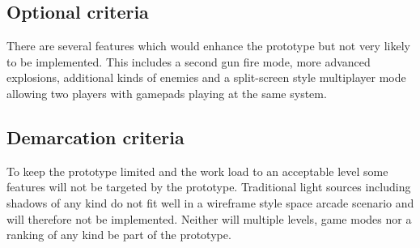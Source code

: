 \documentclass[a4paper]{article}
\begin{document}
\subsection*{Optional criteria}
There are several features which would enhance the prototype but not very likely to be implemented. This includes a second gun fire mode, more advanced explosions, additional kinds of enemies and a split-screen style multiplayer mode allowing two players with gamepads playing at the same system.

\subsection*{Demarcation criteria}
To keep the prototype limited and the work load to an acceptable level some features will not be targeted by the prototype. Traditional light sources including shadows of any kind do not fit well in a wireframe style space arcade scenario and will therefore not be implemented. Neither will multiple levels, game modes nor a ranking of any kind be part of the prototype.

\newpage

\nocite{pewpewgame}
\nocite{iphoneappcafe}
\nocite{androidear}
\nocite{jinput}
\printbibliography

\listoffigures
\end{document}
